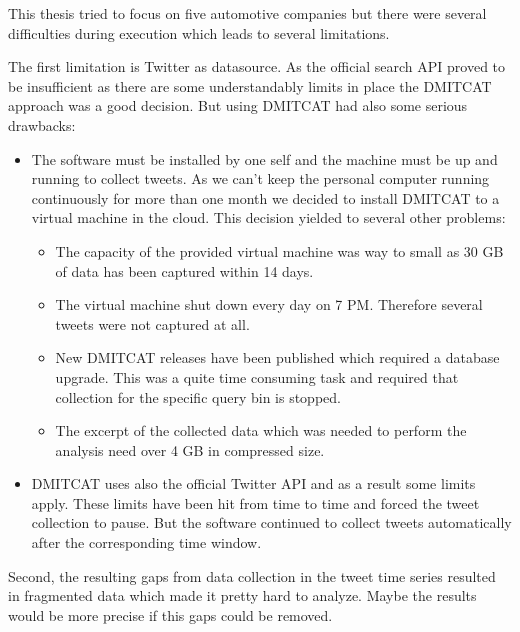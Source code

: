 This thesis tried to focus on five automotive companies but there were several difficulties during execution which leads to several limitations.

The first limitation is Twitter as datasource.
As the official search \ac{API} proved to be insufficient as there are some understandably limits in place the \ac{DMITCAT} approach was a good decision.
But using \ac{DMITCAT} had also some serious drawbacks:

\begin{itemize}
    \item 
        The software must be installed by one self and the machine must be up and running to collect tweets.
        As we can't keep the personal computer running continuously for more than one month we decided to install \ac{DMITCAT} to a virtual machine in the cloud.
        This decision yielded to several other problems:

        \begin{itemize}
            \item 
                The capacity of the provided virtual machine was way to small as 30 \ac{GB} of data has been captured within 14 days.
            \item 
                The virtual machine shut down every day on 7 PM. 
                Therefore several tweets were not captured at all.
            \item 
                New \ac{DMITCAT} releases have been published which required a database upgrade.
                This was a quite time consuming task and required that collection for the specific query bin is stopped.

            \item
                The excerpt of the collected data which was needed to perform the analysis need over 4 \ac{GB} in compressed size.
        \end{itemize}

    \item
        \ac{DMITCAT} uses also the official Twitter \ac{API} and as a result some limits apply.
        These limits have been hit from time to time and forced the tweet collection to pause.
        But the software continued to collect tweets automatically after the corresponding time window.
\end{itemize}

Second, the resulting gaps from data collection in the tweet time series resulted in fragmented data which made it pretty hard to analyze.
Maybe the results would be more precise if this gaps could be removed.

